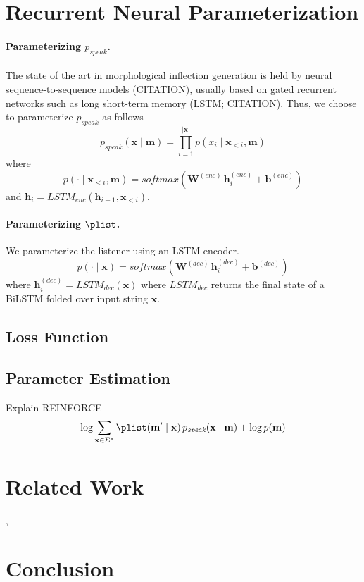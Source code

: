 \documentclass[11pt,a4paper]{article}
\newcommand{\xx}{\mathbf{x}}
\newcommand{\mm}{\mathbf{m}}
\newcommand{\pspeak}{p_{\textit{speak}}}
\newcommand{\vech}{\mathbf{h}}
\newcommand{\vecb}{\mathbf{b}}
\begin{document}
\section{Recurrent Neural Parameterization}\label{sec:parameterization}

\paragraph{Parameterizing $\pspeak$.}\label{sec:i-e-mapper}
The state of the art in morphological inflection generation is held by
neural sequence-to-sequence models (CITATION), usually based on gated recurrent
networks such as long short-term memory (LSTM; CITATION). Thus, we choose
to parameterize $\pspeak$ as follows
\begin{equation}
  \pspeak(\xx \mid \mm) = \prod_{i=1}^{|\xx|} p(x_i \mid \xx_{< i}, \mm) 
\end{equation}
where
\begin{equation}
  p(\cdot \mid \xx_{< i}, \mm) = \textit{softmax}\left(\mathbf{W}^{(\textit{enc})}\, \vech^{(\textit{enc})}_i + \vecb^{(\textit{enc})} \right)
\end{equation}
and $\vech_i = \textit{LSTM}_{\textit{enc}}(\vech_{i-1}, \xx_{< i})$.

\paragraph{Parameterizing $\plist$.}\label{sec:e-i-mapper}
We parameterize the listener using an LSTM encoder.
\begin{equation}
p(\cdot \mid \xx) = \textit{softmax}\left(\mathbf{W}^{(\textit{dec})}\, \vech^{(\textit{dec})}_i + \vecb^{(\textit{dec})} \right)
\end{equation}
where $\vech^{(\textit{dec})}_i = \textit{LSTM}_{\textit{dec}}(\xx)$ where $\textit{LSTM}_{\textit{dec}}$ returns the final state of a BiLSTM folded over input string $\xx$. 

\subsection{Loss Function}\label{sec:loss}

\subsection{Parameter Estimation}
Explain REINFORCE \cite{williams1992simple}
\begin{align}
\log  \sum_{\xx \in \Sigma^*}\plist(\mm' \mid \xx)\, \pspeak(\xx \mid \mm) + \log p(\mm)
\end{align}

\section{Related Work}
, 

\section{Conclusion}



\end{document}
